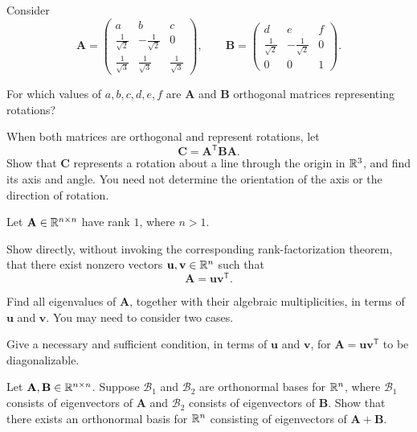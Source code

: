 \begin{problem}
Consider
\[
\mathbf A=
\begin{pmatrix}
a&b&c\\
\frac1{\sqrt2}&-\frac1{\sqrt2}&0\\
\frac1{\sqrt3}&\frac1{\sqrt3}&\frac1{\sqrt3}
\end{pmatrix},
\qquad
\mathbf B=
\begin{pmatrix}
d&e&f\\
\frac1{\sqrt2}&-\frac1{\sqrt2}&0\\
0&0&1
\end{pmatrix}.
\]
\begin{problemsubparts}
\item For which values of $a,b,c,d,e,f$ are $\mathbf A$ and $\mathbf B$ orthogonal matrices representing rotations?
\item When both matrices are orthogonal and represent rotations, let
\[
\mathbf C=\mathbf A^{\mathsf T}\mathbf B\mathbf A.
\]
Show that $\mathbf C$ represents a rotation about a line through the origin in $\mathbb{R}^3$, and find its axis and angle. You need not determine the orientation of the axis or the direction of rotation.
\end{problemsubparts}
\end{problem}

\begin{problem}
Let $\mathbf A\in\mathbb{R}^{n\times n}$ have rank $1$, where $n>1$.
\begin{problemsubparts}
\item Show directly, without invoking the corresponding rank-factorization theorem, that there exist nonzero vectors $\mathbf u,\mathbf v\in\mathbb{R}^n$ such that
\[
\mathbf A=\mathbf u\mathbf v^{\mathsf T}.
\]
\item Find all eigenvalues of $\mathbf A$, together with their algebraic multiplicities, in terms of $\mathbf u$ and $\mathbf v$. You may need to consider two cases.
\item Give a necessary and sufficient condition, in terms of $\mathbf u$ and $\mathbf v$, for $\mathbf A=\mathbf u\mathbf v^{\mathsf T}$ to be diagonalizable.
\end{problemsubparts}
\end{problem}

\begin{problem}
Let $\mathbf A,\mathbf B\in\mathbb{R}^{n\times n}$. Suppose $\mathcal B_1$ and $\mathcal B_2$ are orthonormal bases for $\mathbb{R}^n$, where $\mathcal B_1$ consists of eigenvectors of $\mathbf A$ and $\mathcal B_2$ consists of eigenvectors of $\mathbf B$. Show that there exists an orthonormal basis for $\mathbb{R}^n$ consisting of eigenvectors of $\mathbf A+\mathbf B$.
\end{problem}

